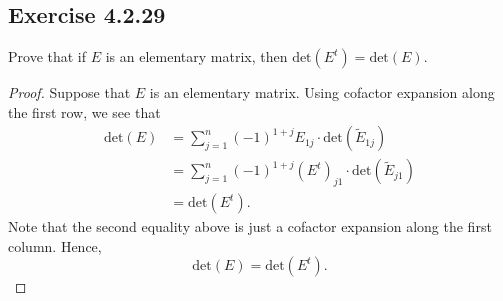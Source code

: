 \subsection*{Exercise 4.2.29} Prove that if \( E  \) is an elementary matrix, then \( \text{det}(E^{t}) = \text{det}(E) \).
\begin{proof}
Suppose that \( E  \) is an elementary matrix. Using cofactor expansion along the first row, we see that 
\begin{align*}
    \text{det}(E) &= \sum_{ j=1 }^{ n } (-1)^{1 + j} {E}_{1j} \cdot \text{det}({\tilde{E}}_{1j}) \\
                  &= \sum_{ j=1 }^{ n } (-1)^{1 + j} (E^{t})_{j1} \cdot \text{det}({\tilde{E}}_{j1}) \\
                  &= \text{det}(E^{t}).
\end{align*}
Note that the second equality above is just a cofactor expansion along the first column. Hence, 
\[  \text{det}(E) = \text{det}(E^{t}). \]
\end{proof}


